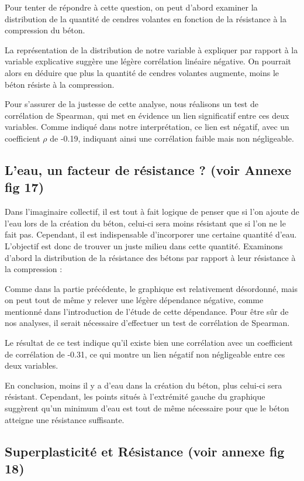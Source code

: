 \documentclass[
  12pt,
]{article}
\begin{document}
Pour tenter de répondre à cette question, on peut d'abord examiner la
distribution de la quantité de cendres volantes en fonction de la
résistance à la compression du béton.

La représentation de la distribution de notre variable à expliquer par
rapport à la variable explicative suggère une légère corrélation
linéaire négative. On pourrait alors en déduire que plus la quantité de
cendres volantes augmente, moins le béton résiste à la compression.

Pour s'assurer de la justesse de cette analyse, nous réalisons un test
de corrélation de Spearman, qui met en évidence un lien significatif
entre ces deux variables. Comme indiqué dans notre interprétation, ce
lien est négatif, avec un coefficient \(\rho\) de -0.19, indiquant ainsi
une corrélation faible mais non négligeable.

\subsection{L'eau, un facteur de résistance ? (voir Annexe fig
17)}\label{leau-un-facteur-de-ruxe9sistance-voir-annexe-fig-17}

Dans l'imaginaire collectif, il est tout à fait logique de penser que si
l'on ajoute de l'eau lors de la création du béton, celui-ci sera moins
résistant que si l'on ne le fait pas. Cependant, il est indispensable
d'incorporer une certaine quantité d'eau. L'objectif est donc de trouver
un juste milieu dans cette quantité. Examinons d'abord la distribution
de la résistance des bétons par rapport à leur résistance à la
compression :

Comme dans la partie précédente, le graphique est relativement
désordonné, mais on peut tout de même y relever une légère dépendance
négative, comme mentionné dans l'introduction de l'étude de cette
dépendance. Pour être sûr de nos analyses, il serait nécessaire
d'effectuer un test de corrélation de Spearman.

Le résultat de ce test indique qu'il existe bien une corrélation avec un
coefficient de corrélation de -0.31, ce qui montre un lien négatif non
négligeable entre ces deux variables.

En conclusion, moins il y a d'eau dans la création du béton, plus
celui-ci sera résistant. Cependant, les points situés à l'extrémité
gauche du graphique suggèrent qu'un minimum d'eau est tout de même
nécessaire pour que le béton atteigne une résistance suffisante.

\subsection{Superplasticité et Résistance (voir annexe fig
18)}\label{superplasticituxe9-et-ruxe9sistance-voir-annexe-fig-18}
\end{document}
